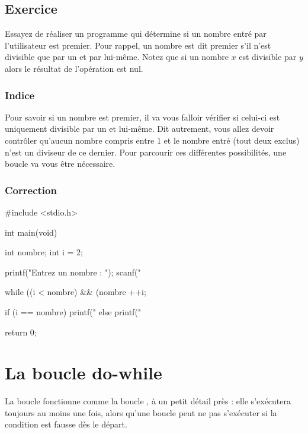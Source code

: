 \subsection{Exercice}
\label{exercice-3}

Essayez de réaliser un programme qui détermine si un nombre entré par
l'utilisateur est premier. Pour rappel, un nombre est dit premier s'il
n'est divisible que par un et par lui-même. Notez que si un nombre \(x\)
est divisible par \(y\) alors le résultat de l'opération
 est nul.

\subsubsection{Indice}
\label{indice-1}

\begin{secretbox}
 Pour savoir si un nombre est premier, il
va vous falloir vérifier si celui-ci est uniquement divisible par un et
lui-même. Dit autrement, vous allez devoir contrôler qu'aucun nombre
compris entre 1 et le nombre entré (tout deux exclus) n'est un diviseur
de ce dernier. Pour parcourir ces différentes possibilités, une boucle
va vous être nécessaire.
\end{secretbox}


\subsubsection{Correction}
\label{correction-4}

\begin{C}
 #include <stdio.h>


int main(void)
{
   int nombre;
   int i = 2;

   printf("Entrez un nombre : ");
   scanf("%

   while ((i < nombre) && (nombre %
   {
       ++i;
   }

   if (i == nombre)
   {
       printf("%
   }
   else
   {
       printf("%
   }

   return 0;
}
\end{C}

\section{La boucle do-while}
\label{la-boucle-do-while}

La boucle  fonctionne comme la boucle ,
à un petit détail près : elle s'exécutera toujours au moins une fois,
alors qu'une boucle  peut ne pas s'exécuter si la
condition est fausse dès le départ.

